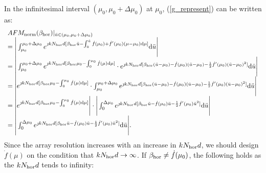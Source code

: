 \documentclass[12pt,draftclsnofoot,onecolumn]{IEEEtran}
\begin{document}
		In the infinitesimal interval $(\mu_0, \mu_0+\Delta \mu_0)$ at $\mu_0$, (\ref{g_represent}) can be written as:
		\begin{equation}\label{microelement on mu}
			\begin{array}{l}
				AFM_{\rm norm}({\beta _{\rm hor}}){|_{\ddot{u}  \in ({\mu _0},{\mu _0} + \Delta \mu_0 )}}\\
				= \Bigg|\int_{{\mu _0}}^{{\mu _0} + \Delta \mu_0 } {{e^{{\jmath}kN_{\rm hor}d[{\beta _{\rm hor}}\ddot{u} - \int_0^{\ddot{u}}  {\dot{f}(\mu_0)+\dot{f}'(\mu_0)(\mu-\mu_0){\rm d}{\mu}} ]}}} {\rm d}{\ddot{u}} \Bigg|\\
				= \Bigg|\int_{{\mu _0}}^{{\mu _0} + \Delta \mu_0 } {{e^{{\jmath}kN_{\rm hor}d[{\beta _{\rm hor}}{\mu _0} - \int_0^{{\mu _0}} {\dot{f}(\mu){\rm d}{\mu}} ]}}}  \cdot {e^{{\jmath}kN_{\rm hor}d[{\beta _{\rm hor}}(\ddot{u}  - {\mu _0}) - \dot{f}(\mu_0)(\ddot{u}-\mu_0)-\frac{1}{2}\dot{f}'(\mu_0)(\ddot{u}-\mu_0)^2]}}{\rm d}{\ddot{u}} \Bigg|\\
				= \Bigg|{e^{{\jmath}kN_{\rm hor}d[{\beta _{\rm hor}}{\mu _0} - \int_0^{{\mu _0}} {\dot{f}(\mu){\rm d}{\mu}} ]}} \cdot \int_{{\mu _0}}^{{\mu _0} + \Delta \mu_0 } {e^{{\jmath}kN_{\rm hor}d[{\beta _{\rm hor}}(\ddot{u}  - {\mu _0}) - \dot{f}(\mu_0)(\ddot{u}-\mu_0)-\frac{1}{2}\dot{f}'(\mu_0)(\ddot{u}-\mu_0)^2]}}{\rm d}{\ddot{u}}  \Bigg|\\
				= \Bigg|{e^{{\jmath}kN_{\rm hor}d[{\beta _{\rm hor}}{\mu _0} - \int_0^{{\mu _0}} {\dot{f}(\mu){\rm d}{\mu}} ]}}\Bigg| \cdot \Bigg|\int_{{0}}^{ \Delta \mu_0 } {{e^{{\jmath}kN_{\rm hor}d[{\beta _{\rm hor}}\ddot{u} - \dot{f}({\mu _0})\ddot{u}-\frac{1}{2}\dot{f}'(\mu_0)\ddot{u}^2 ]}}} {\rm d}{\ddot{u}} \Bigg|\\
				= \Bigg|\int_{{0}}^{ \Delta \mu_0 } {{e^{{\jmath}kN_{\rm hor}d[{\beta _{\rm hor}}\ddot{u} - \dot{f}({\mu _0})\ddot{u}-\frac{1}{2}\dot{f}'(\mu_0)\ddot{u}^2 ]}}} {\rm d}{\ddot{u}} \Bigg|.
			\end{array}
		\end{equation}	
		Since the array resolution increases with an increase in $kN_{\rm hor}d$, we should design $\dot{f}(\mu)$ on the condition that $kN_{\rm hor}d \to \infty$.
		If $\beta_{\rm hor}\ne \dot{f}(\mu_0)$,  the following holds as the $kN_{\rm hor}d$ tends to infinity:
\end{document}
